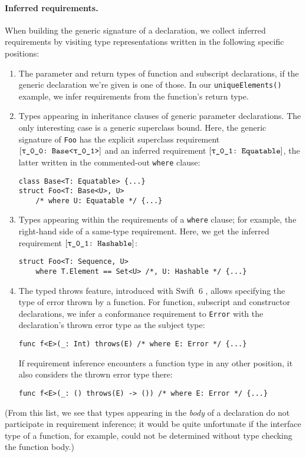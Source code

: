 \documentclass[../generics]{subfiles}
\begin{document}
\paragraph{Inferred requirements.} When building the generic signature of a declaration, we collect inferred requirements by visiting type representations written in the following specific positions:
\begin{enumerate}
\item The parameter and return types of function and subscript declarations, if the generic declaration we're given is one of those. In our \texttt{uniqueElements()} example, we infer requirements from the function's return type.

\item Types appearing in inheritance clauses of generic parameter declarations. The only interesting case is a generic superclass bound. Here, the generic signature of \texttt{Foo} has the explicit superclass requirement $[\texttt{\texttt{$\uptau$\_0\_0}:~Base<\texttt{$\uptau$\_0\_1}>}]$ and an inferred requirement $[\texttt{\texttt{$\uptau$\_0\_1}:~Equatable}]$, the latter written in the commented-out \texttt{where} clause:
\begin{Verbatim}
class Base<T: Equatable> {...}
struct Foo<T: Base<U>, U>
    /* where U: Equatable */ {...}
\end{Verbatim}

\item Types appearing within the requirements of a \texttt{where} clause; for example, the right-hand side of a same-type requirement. Here, we get the inferred requirement $[\texttt{\texttt{$\uptau$\_0\_1}:~Hashable}]$:
\begin{Verbatim}
struct Foo<T: Sequence, U>
    where T.Element == Set<U> /*, U: Hashable */ {...}
\end{Verbatim}

\item The typed throws feature, introduced with Swift~6 \cite{se0413}, allows specifying the type of error thrown by a function. For function, subscript and constructor declarations, we infer a conformance requirement to \texttt{Error} with the declaration's thrown error type as the subject type:
\begin{Verbatim}
func f<E>(_: Int) throws(E) /* where E: Error */ {...}
\end{Verbatim}
If requirement inference encounters a function type in any other position, it also considers the thrown error type there:
\begin{Verbatim}
func f<E>(_: () throws(E) -> ()) /* where E: Error */ {...}
\end{Verbatim}
\end{enumerate}
(From this list, we see that types appearing in the \emph{body} of a declaration do not participate in requirement inference; it would be quite unfortunate if the interface type of a function, for example, could not be determined without type checking the function body.)
\end{document}
